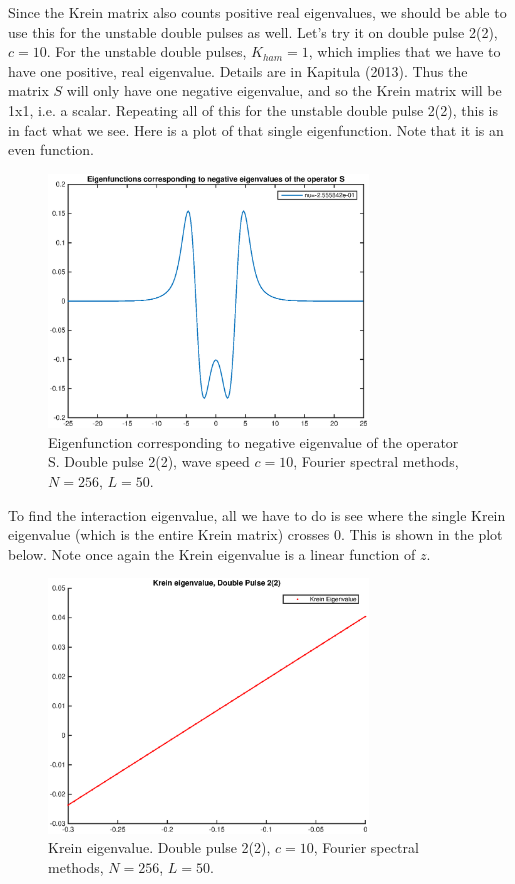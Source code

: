 \documentclass[12pt]{article}
\begin{document}
Since the Krein matrix also counts positive real eigenvalues, we should be able to use this for the unstable double pulses as well. Let's try it on double pulse 2(2), $c = 10$. For the unstable double pulses, $K_{ham} = 1$, which implies that we have to have one positive, real eigenvalue. Details are in Kapitula (2013). Thus the matrix $S$ will only have one negative eigenvalue, and so the Krein matrix will be 1x1, i.e. a scalar. Repeating all of this for the unstable double pulse 2(2), this is in fact what we see. Here is a plot of that single eigenfunction. Note that it is an even function.

\begin{figure}[H]
	\includegraphics[width=8.5cm]{dp1vNeg}
	\caption{Eigenfunction corresponding to negative eigenvalue of the operator S. Double pulse 2(2), wave speed $c = 10$, Fourier spectral methods, $N = 256$, $L = 50$.}
\end{figure}

To find the interaction eigenvalue, all we have to do is see where the single Krein eigenvalue (which is the entire Krein matrix) crosses 0. This is shown in the plot below. Note once again the Krein eigenvalue is a linear function of $z$. 

\begin{figure}[H]
	\includegraphics[width=8.5cm]{dp1kreineig1}
	\caption{Krein eigenvalue. Double pulse 2(2), $c = 10$, Fourier spectral methods, $N = 256$, $L = 50$. }
\end{figure}
\end{document}
